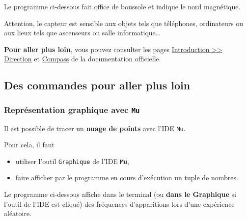 \begin{methode}
Le programme ci-dessous fait office de boussole et indique le nord magnétique.

Attention, le capteur est sensible aux objets tels que téléphones, ordinateurs ou aux lieux tels que ascenseurs ou salle informatique\ldots

\end{methode}

\begin{remarque}
\textbf{Pour aller plus loin}, vous pouvez consulter les pages  \href{https://microbit-micropython.readthedocs.io/fr/latest/tutorials/direction.html}{Introduction >> Direction} et \href{https://microbit-micropython.readthedocs.io/fr/latest/compass.html}{Compass} de la documentation officielle.
\end{remarque}





\newpage

\subsection{Des commandes pour aller plus loin}


\subsubsection{Représentation graphique avec \texttt{Mu}}

Il est possible de tracer un \textbf{nuage de points} avec l'IDE \texttt{Mu}.

Pour cela, il faut 
\begin{itemize}
    \item utiliser l'outil \texttt{Graphique} de l'IDE \texttt{Mu},
    \item faire afficher par le programme en cours d'exécution un tuple de nombres.
\end{itemize}


\begin{methode}
Le programme ci-dessous affiche dans le terminal (ou \textbf{dans le Graphique} si l'outil de l'IDE est cliqué) des fréquences d'apparitions lors d'une expérience aléatoire.
\end{methode}



